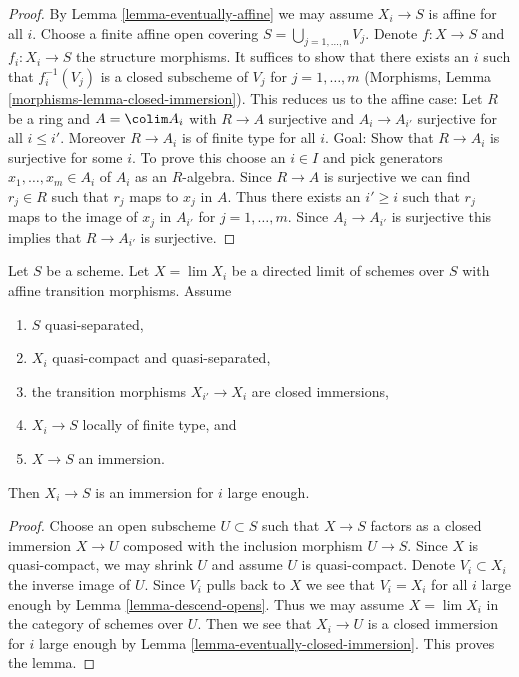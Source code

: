 \begin{proof}
By Lemma \ref{lemma-eventually-affine}
we may assume $X_i \to S$ is affine for all $i$.
Choose a finite affine open covering $S = \bigcup_{j = 1, \ldots, n} V_j$.
Denote $f : X \to S$ and $f_i : X_i \to S$ the structure morphisms.
It suffices to show that there exists an $i$ such that
$f_i^{-1}(V_j)$ is a closed subscheme of $V_j$ for $j = 1, \ldots, m$
(Morphisms, Lemma \ref{morphisms-lemma-closed-immersion}).
This reduces us to the affine case: Let $R$ be a ring and
$A = \colim A_i$ with $R \to A$ surjective and $A_i \to A_{i'}$
surjective for all $i \leq i'$. Moreover $R \to A_i$ is of finite type
for all $i$. Goal: Show that $R \to A_i$ is surjective for some $i$.
To prove this choose an $i \in I$ and pick generators
$x_1, \ldots, x_m \in A_i$ of $A_i$ as an $R$-algebra.
Since $R \to A$ is surjective we can find
$r_j \in R$ such that $r_j$ maps to $x_j$ in $A$.
Thus there exists an $i' \geq i$ such that $r_j$ maps to the image
of $x_j$ in $A_{i'}$ for $j = 1, \ldots, m$. Since $A_i \to A_{i'}$
is surjective this implies that $R \to A_{i'}$ is surjective.
\end{proof}

\begin{lemma}
\label{lemma-eventually-immersion}
Let $S$ be a scheme. Let $X = \lim X_i$ be a directed limit of schemes
over $S$ with affine transition morphisms. Assume
\begin{enumerate}
\item $S$ quasi-separated,
\item $X_i$ quasi-compact and quasi-separated,
\item the transition morphisms $X_{i'} \to X_i$ are closed immersions,
\item $X_i \to S$ locally of finite type, and
\item $X \to S$ an immersion.
\end{enumerate}
Then $X_i \to S$ is an immersion for $i$ large enough.
\end{lemma}

\begin{proof}
Choose an open subscheme $U \subset S$ such that $X \to S$ factors
as a closed immersion $X \to U$ composed with the inclusion morphism
$U \to S$. Since $X$ is quasi-compact, we may shrink $U$ and assume
$U$ is quasi-compact. Denote $V_i \subset X_i$ the inverse image of $U$.
Since $V_i$ pulls back to $X$ we see that $V_i = X_i$ for all $i$
large enough by Lemma \ref{lemma-descend-opens}. Thus we may
assume $X = \lim X_i$ in the category of schemes over $U$.
Then we see that $X_i \to U$ is a closed immersion for $i$
large enough by Lemma \ref{lemma-eventually-closed-immersion}.
This proves the lemma.
\end{proof}










